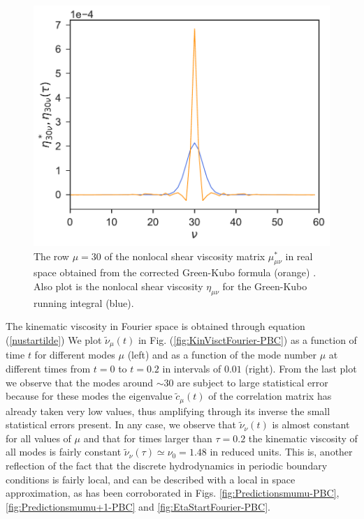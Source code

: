 \documentclass[b5paper,openright,10pt]{book}
\begin{document}
\begin{figure}[h!]
  \centering
\includegraphics[scale=0.41]{CompareEtas-PBC}
\caption[Comparison $\eta^*_{30,\nu}$ and $eta_{30,\nu}$ for an unconfined fluid]{The row $\mu=30$ of the nonlocal shear viscosity matrix $\mu^{*}_{\mu\nu}$ in real space obtained from the corrected Green-Kubo formula (orange) . Also plot is the nonlocal shear viscosity $\eta_{\mu\nu}$ for the Green-Kubo running integral (blue).}
\label{fig:CompareEtas-PBC}
\end{figure}


The kinematic viscosity  in Fourier space is  obtained through equation (\ref{nustartilde})
We plot $\tilde{\nu}_\mu(t)$  in Fig.  (\ref{fig:KinVisctFourier-PBC}) as a  function of time
$t$ for  different modes  $\mu$ (left)  and as a  function of  the mode
number $\mu$  at different times from $t=0$ to $t=0.2$ in intervals of $0.01$ (right). From
the last plot  we observe that the modes around  $\sim 30$ are subject
to  large statistical  error because  for these  modes the  eigenvalue
$\tilde{c}_\mu(t)$ of  the correlation  matrix has already  taken very
low values, thus  amplifying through its inverse  the small statistical
errors present. In  any case, we observe  that $\tilde{\nu}_\nu(t)$ is
almost constant for all values of $\mu$ and that for times larger than
$\tau=0.2$ the  kinematic viscosity  of all  modes is  fairly constant
$\tilde{\nu}_\nu(\tau)\simeq\nu_0=1.48$  in  reduced units.  This  is,
another reflection  of the  fact that the  discrete hydrodynamics in 
periodic boundary conditions is fairly local, and can be described with
 a local in space approximation, as has been corroborated in Figs. 
 \ref{fig:Predictionsmumu-PBC}, \ref{fig:Predictionsmumu+1-PBC} and \ref{fig:EtaStartFourier-PBC}.
\end{document}
